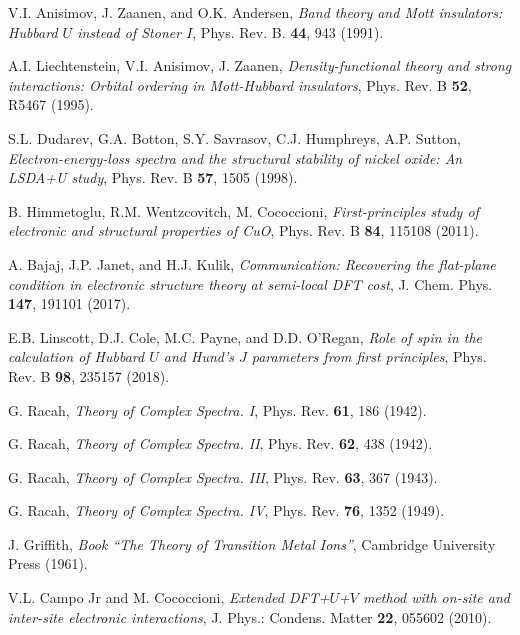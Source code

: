 \documentclass[12pt,a4paper]{article}
\begin{document}
\begin{thebibliography}{100}
  
   V.I. Anisimov, J. Zaanen, and O.K. Andersen, \textit{Band theory and Mott insulators: Hubbard $U$ instead of Stoner $I$}, Phys. Rev. B. {\bf 44}, 943 (1991).
  
   A.I. Liechtenstein, V.I. Anisimov, J. Zaanen, \textit{Density-functional theory and strong interactions: Orbital ordering in Mott-Hubbard insulators}, Phys. Rev. B {\bf 52}, R5467 (1995).
  
   S.L. Dudarev, G.A. Botton, S.Y. Savrasov, C.J. Humphreys, A.P. Sutton, \textit{Electron-energy-loss spectra and the structural stability of nickel oxide: An LSDA+U study}, Phys. Rev. B {\bf 57}, 1505 (1998).
  
   B. Himmetoglu, R.M. Wentzcovitch, M. Cococcioni, \textit{First-principles study of electronic and structural properties of CuO}, Phys. Rev. B {\bf 84}, 115108 (2011). 
  
   A. Bajaj, J.P. Janet, and H.J. Kulik, \textit{Communication: Recovering the flat-plane condition in electronic structure theory at semi-local DFT cost}, J. Chem. Phys. {\bf 147}, 191101 (2017).
  
   E.B. Linscott, D.J. Cole, M.C. Payne, and D.D. O'Regan, \textit{Role of spin in the calculation of Hubbard $U$ and Hund's $J$ parameters from first principles}, Phys. Rev. B {\bf 98}, 235157 (2018).
  
   G. Racah, \textit{Theory of Complex Spectra. I}, Phys. Rev. {\bf 61}, 186 (1942).
  
   G. Racah, \textit{Theory of Complex Spectra. II}, Phys. Rev. {\bf 62}, 438 (1942).
  
   G. Racah, \textit{Theory of Complex Spectra. III}, Phys. Rev. {\bf 63}, 367 (1943).
  
   G. Racah, \textit{Theory of Complex Spectra. IV}, Phys. Rev. {\bf 76}, 1352 (1949).
  
   J. Griffith, \textit{Book ``The Theory of Transition Metal Ions''}, Cambridge University Press (1961).
  
   V.L. Campo Jr and M. Cococcioni, \textit{Extended DFT+$U$+$V$ method with on-site and inter-site electronic interactions}, J. Phys.: Condens. Matter {\bf 22}, 055602 (2010).
  

\end{thebibliography}
\end{document}
